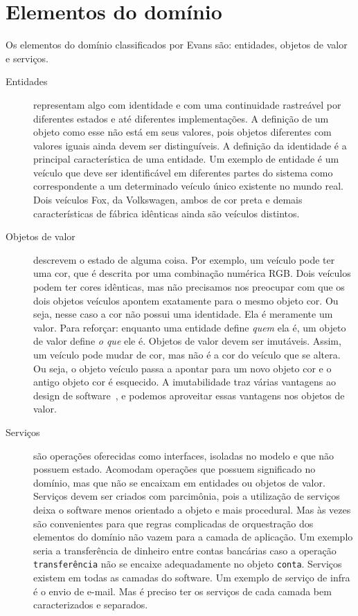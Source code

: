 \documentclass[a4paper, 12pt]{article}
\newcommand{\code}[1]{\texttt{#1}}
\begin{document}
\section{Elementos do domínio}

Os elementos do domínio classificados por Evans são: entidades, objetos de valor e serviços.

\begin{description}

\item [Entidades] representam algo com identidade e com uma continuidade rastreável por diferentes estados e até diferentes implementações. A definição de um objeto como esse não está em seus valores, pois objetos diferentes com valores iguais ainda devem ser distinguíveis. A definição da identidade é a principal característica de uma entidade. Um exemplo de entidade é um veículo que deve ser identificável em diferentes partes do sistema como correspondente a um determinado veículo único existente no mundo real. Dois veículos Fox, da Volkswagen, ambos de cor preta e demais características de fábrica idênticas ainda são veículos distintos.

\item [Objetos de valor] descrevem o estado de alguma coisa. Por exemplo, um veículo pode ter uma cor, que é descrita por uma combinação numérica RGB. Dois veículos podem ter cores idênticas, mas não precisamos nos preocupar com que os dois objetos veículos apontem exatamente para o mesmo objeto cor. Ou seja, nesse caso a cor não possui uma identidade. Ela é meramente um valor. Para reforçar: enquanto uma entidade define \emph{quem} ela é, um objeto de valor define \emph{o que} ele é. Objetos de valor devem ser imutáveis. Assim, um veículo pode mudar de cor, mas não é a cor do veículo que se altera. Ou seja, o objeto veículo passa a apontar para um novo objeto cor e o antigo objeto cor é esquecido. A imutabilidade traz várias vantagens ao design de software~\cite{Bloch2008Mutability}, e podemos aproveitar essas vantagens nos objetos de valor.

\item [Serviços] são operações oferecidas como interfaces, isoladas no modelo e que não possuem estado. Acomodam operações que possuem significado no domínio, mas que não se encaixam em entidades ou objetos de valor. Serviços devem ser criados com parcimônia, pois a utilização de serviços deixa o software menos orientado a objeto e mais procedural. Mas às vezes são convenientes para que regras complicadas de orquestração dos elementos do domínio não vazem para a camada de aplicação. Um exemplo seria a transferência de dinheiro entre contas bancárias caso a operação \code{transferência} não se encaixe adequadamente no objeto \code{conta}. Serviços existem em todas as camadas do software. Um exemplo de serviço de infra é o envio de e-mail. Mas é preciso ter os serviços de cada camada bem caracterizados e separados.


\end{description}
\end{document}
